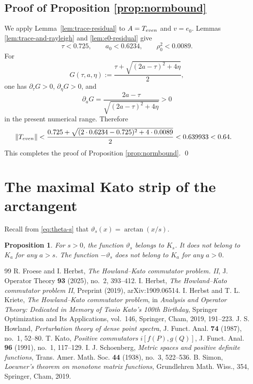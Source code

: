 \documentclass[10pt,a4paper]{amsart}
\newtheorem{proposition}[theorem]{Proposition}
\newcommand{\norm}[1]{\left\lVert #1\right\rVert}
\begin{document}

\subsection*{Proof of Proposition \ref{prop:normbound}}

We apply Lemma~\ref{lem:trace-residual} to
$A=T_{\rm even}$ and $v=e_0$.  Lemmas
\ref{lem:trace-and-rayleigh} and \ref{lem:e0-residual} give
\[
\tau<0.725,
\qquad
a_0<0.6234,
\qquad
\rho_0^2<0.0089.
\]
For
\[
G(\tau,a,\eta)
:=\frac{\tau+\sqrt{(2a-\tau)^2+4\eta}}{2},
\]
one has $\partial_\tau G>0$, $\partial_\eta G>0$, and
\[
\partial_aG
=\frac{2a-\tau}{\sqrt{(2a-\tau)^2+4\eta}}>0
\]
in the present numerical range.  Therefore
\begin{align*}
\norm{T_{\rm even}}
&<\frac{0.725+
\sqrt{(2\cdot0.6234-0.725)^2+4\cdot0.0089}}{2}<0.639933<0.64.
\end{align*}
This completes the proof of Proposition \ref{prop:normbound}.
\qed




\section{The maximal Kato strip of the arctangent}\label{sec:arctank1}

Recall from \eqref{eq:theta-s} that $\vartheta_s(x)=\arctan(x/s)$.

\begin{proposition}\label{prop:arctan-strip}
For $s>0$, the function $\vartheta_s$ belongs to $K_s$.  It does not belong to $K_a$ for any $a>s$. The function $-\vartheta_s$ does not belong to $K_a$ for any $a>0$.
\end{proposition}


\begin{thebibliography}{99}
 R. Froese and I. Herbst, \emph{The Howland--Kato commutator problem. II}, J. Operator Theory \textbf{93} (2025), no.~2, 393--412.
 I. Herbst, \emph{The Howland--Kato commutator problem II}, Preprint (2019), arXiv:1909.06514.
 I. Herbst and T. L. Kriete, \emph{The Howland--Kato commutator problem}, in \emph{Analysis and Operator Theory: Dedicated in Memory of Tosio Kato's 100th Birthday}, Springer Optimization and Its Applications, vol.~146, Springer, Cham, 2019, 191--223.
 J. S. Howland, \emph{Perturbation theory of dense point spectra}, J. Funct. Anal. \textbf{74} (1987), no.~1, 52--80.
 T. Kato, \emph{Positive commutators $i[f(P),g(Q)]$}, J. Funct. Anal. \textbf{96} (1991), no.~1, 117--129.
 I. J. Schoenberg, \emph{Metric spaces and positive definite functions}, Trans. Amer. Math. Soc. \textbf{44} (1938), no.~3, 522--536.
 B. Simon, \emph{Loewner's theorem on monotone matrix functions}, Grundlehren Math. Wiss., 354, Springer, Cham, 2019.
\end{thebibliography}
\end{document}
